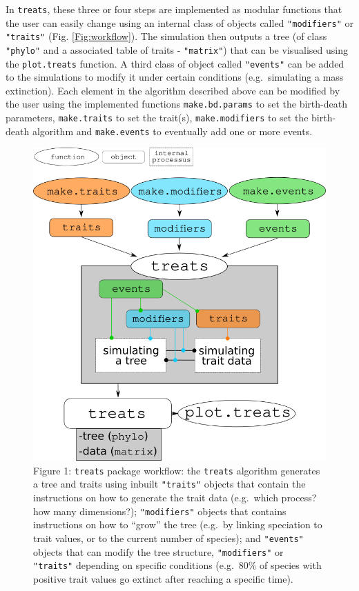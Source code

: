 \documentclass[
]{article}
\begin{document}
In \texttt{treats}, these three or four steps are implemented as modular
functions that the user can easily change using an internal class of
objects called \texttt{"modifiers"} or \texttt{"traits"} (Fig.
\ref{Fig:workflow}). The simulation then outputs a tree (of class
\texttt{"phylo"} and a associated table of traits - \texttt{"matrix"})
that can be visualised using the \texttt{plot.treats} function. A third
class of object called \texttt{"events"} can be added to the simulations
to modify it under certain conditions (e.g.~simulating a mass
extinction). Each element in the algorithm described above can be
modified by the user using the implemented functions
\texttt{make.bd.params} to set the birth-death parameters,
\texttt{make.traits} to set the trait(s), \texttt{make.modifiers} to set
the birth-death algorithm and \texttt{make.events} to eventually add one
or more events.

\begin{figure}
\hypertarget{figure1}{%
\centering
\includegraphics{../inst/gitbook/treats_structure.png}
\caption{Figure 1: \texttt{treats} package workflow: the \texttt{treats}
algorithm generates a tree and traits using inbuilt \texttt{"traits"}
objects that contain the instructions on how to generate the trait data
(e.g.~which process? how many dimensions?); \texttt{"modifiers"} objects
that contains instructions on how to ``grow'' the tree (e.g.~by linking
speciation to trait values, or to the current number of species); and
\texttt{"events"} objects that can modify the tree structure,
\texttt{"modifiers"} or \texttt{"traits"} depending on specific
conditions (e.g.~80\% of species with positive trait values go extinct
after reaching a specific time).}\label{figure1}
}
\end{figure}
\end{document}
